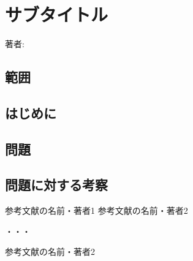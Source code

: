 \documentclass[onecolumn,11pt]{jsbook}
\begin{document}
\chapter{サブタイトル}

著者:

\section{範囲}


\section{はじめに}

\section{問題}


\section{問題に対する考察}


\begin{thebibliography}{9}
   参考文献の名前・著者1
   参考文献の名前・著者2

  ・・・

   参考文献の名前・著者2
\end{thebibliography}
\end{document}
